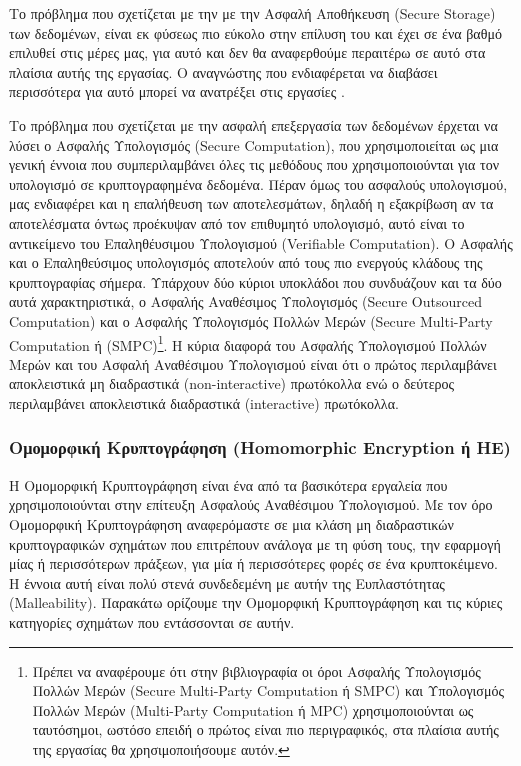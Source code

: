 Το πρόβλημα που σχετίζεται με την με την Ασφαλή Αποθήκευση (Secure Storage) των δεδομένων, είναι εκ φύσεως πιο εύκολο στην επίλυση του και έχει σε ένα βαθμό επιλυθεί στις μέρες μας, για αυτό και δεν θα αναφερθούμε περαιτέρω σε αυτό στα πλαίσια αυτής της εργασίας. Ο αναγνώστης που ενδιαφέρεται να διαβάσει περισσότερα για αυτό μπορεί να ανατρέξει στις εργασίες \cite{10.1145/1315245.1315318} \cite{DBLP:journals/access/Gupta0LB22}. 

Το πρόβλημα που σχετίζεται με την ασφαλή επεξεργασία των δεδομένων έρχεται να λύσει ο Ασφαλής Υπολογισμός (Secure Computation), που χρησιμοποιείται ως μια γενική έννοια που συμπεριλαμβάνει όλες τις μεθόδους που χρησιμοποιούνται για τον υπολογισμό σε κρυπτογραφημένα δεδομένα. Πέραν όμως του ασφαλούς υπολογισμού, μας ενδιαφέρει και η επαλήθευση των αποτελεσμάτων, δηλαδή η εξακρίβωση αν τα αποτελέσματα όντως προέκυψαν από τον επιθυμητό υπολογισμό, αυτό είναι το αντικείμενο του Επαληθέυσιμου Υπολογισμού (Verifiable Computation). Ο Ασφαλής και ο Επαληθεύσιμος υπολογισμός αποτελούν από τους πιο ενεργούς κλάδους της κρυπτογραφίας σήμερα. Υπάρχουν δύο κύριοι υποκλάδοι που συνδυάζουν και τα δύο αυτά χαρακτηριστικά, ο Ασφαλής Αναθέσιμος Υπολογισμός (Secure Outsourced Computation) και ο Ασφαλής Υπολογισμός Πολλών Μερών (Secure Multi-Party Computation ή (SMPC)\footnote{Πρέπει να αναφέρουμε ότι στην βιβλιογραφία οι όροι Ασφαλής Υπολογισμός Πολλών Μερών (Secure Multi-Party Computation ή  SMPC) και Υπολογισμός Πολλών Μερών (Multi-Party Computation ή MPC)  χρησιμοποιούνται ως ταυτόσημοι, ωστόσο επειδή ο πρώτος είναι πιο περιγραφικός, στα πλαίσια αυτής της εργασίας θα χρησιμοποιήσουμε αυτόν.}. Η κύρια διαφορά του Ασφαλής Υπολογισμού Πολλών Μερών και του Ασφαλή Αναθέσιμου Υπολογισμού είναι ότι ο πρώτος περιλαμβάνει αποκλειστικά μη διαδραστικά (non-interactive) πρωτόκολλα ενώ ο δεύτερος περιλαμβάνει αποκλειστικά διαδραστικά (interactive) πρωτόκολλα.

\subsubsection{Ομομορφική Κρυπτογράφηση (Homomorphic Encryption ή HE)}
Η Ομομορφική Κρυπτογράφηση είναι ένα από τα βασικότερα εργαλεία που χρησιμοποιούνται στην επίτευξη Ασφαλούς Αναθέσιμου Υπολογισμού. Με τον όρο Ομομορφική Κρυπτογράφηση αναφερόμαστε σε μια κλάση μη διαδραστικών κρυπτογραφικών σχημάτων που επιτρέπουν ανάλογα με τη φύση τους, την εφαρμογή μίας ή περισσότερων πράξεων, για μία ή περισσότερες φορές σε ένα κρυπτοκέιμενο. Η έννοια αυτή είναι πολύ στενά συνδεδεμένη με αυτήν της Ευπλαστότητας (Malleability). Παρακάτω ορίζουμε την Ομομορφική Κρυπτογράφηση και τις κύριες κατηγορίες σχημάτων που εντάσσονται σε αυτήν.

